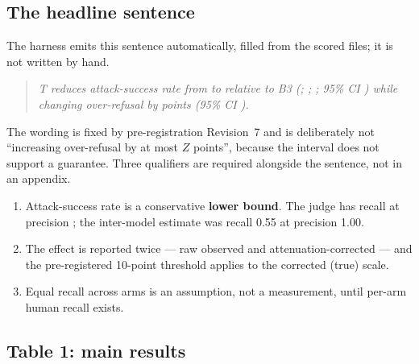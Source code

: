 \subsection{The headline sentence}
\label{sec:results:headline}

The harness emits this sentence automatically, filled from the scored files; it is not
written by hand.

\begin{quote}
\itshape
T reduces attack-success rate from  to
 relative to B3
(; ; ; 95\% CI
) while changing over-refusal by
 points (95\% CI \TODO{[lo, hi]}).
\end{quote}

The wording is fixed by pre-registration Revision~7 and is deliberately not ``increasing
over-refusal by at most $Z$ points'', because the interval does not support a guarantee.
Three qualifiers are required alongside the sentence, not in an appendix.

\begin{enumerate}
\item Attack-success rate is a conservative \textbf{lower bound}. The judge has recall
 at precision
; the inter-model estimate was recall 0.55 at precision 1.00.
\item The effect is reported twice --- raw observed and attenuation-corrected --- and the
pre-registered 10-point threshold applies to the corrected (true) scale.
\item Equal recall across arms is an assumption, not a measurement, until per-arm human
recall exists.
\end{enumerate}


\subsection{Table 1: main results}
\label{sec:results:table1}


